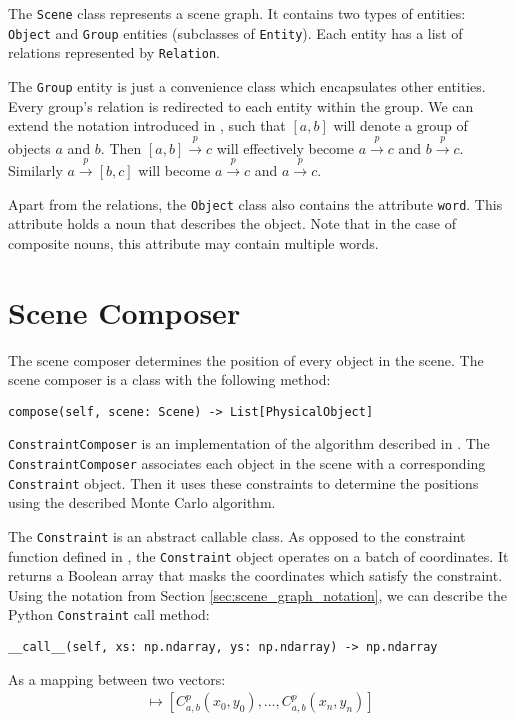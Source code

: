 \medskip

The \verb|Scene| class represents a scene graph. It contains two types of entities: \verb|Object| and \verb|Group| entities (subclasses of \verb|Entity|). Each entity has a list of relations represented by \verb|Relation|. 

\medskip

The \verb|Group| entity is just a convenience class which encapsulates other entities. Every group's relation is redirected to each entity within the group. We can extend the notation introduced in , such that $[a, b]$ will denote a group of objects $a$ and $b$. Then $[a, b] \xrightarrow{p} c$ will effectively become $a \xrightarrow{p} c$ and $b \xrightarrow{p} c$. Similarly $a \xrightarrow{p} [b, c]$ will become $a \xrightarrow{p} c$ and $a \xrightarrow{p} c$.

\medskip

Apart from the relations, the \verb|Object| class also contains the attribute \verb|word|. This attribute holds a noun that describes the object. Note that in the case of composite nouns, this attribute may contain multiple words. 

\section{Scene Composer}

The scene composer determines the position of every object in the scene. The scene composer is a class with the following method:
\begin{verbatim}
compose(self, scene: Scene) -> List[PhysicalObject]
\end{verbatim}

\medskip

\verb|ConstraintComposer| is an implementation of the algorithm described in . The \verb|ConstraintComposer| associates each object in the scene with a corresponding \verb|Constraint| object. Then it uses these constraints to determine the positions using the described Monte Carlo algorithm. 

\medskip

The \verb|Constraint| is an abstract callable class. As opposed to the constraint function defined in , the \verb|Constraint| object operates on a batch of coordinates. It returns a Boolean array that masks the coordinates which satisfy the constraint. Using the notation from Section \ref{sec:scene_graph_notation}, we can describe the Python \verb|Constraint| call method:
\begin{verbatim}
__call__(self, xs: np.ndarray, ys: np.ndarray) -> np.ndarray
\end{verbatim}
As a mapping between two vectors:
\begin{align}
[(x_0, y_0), \ldots, (x_n, y_n)] \mapsto [C_{a,b}^p(x_0, y_0), \ldots, C_{a,b}^p(x_n, y_n)]
\end{align}

